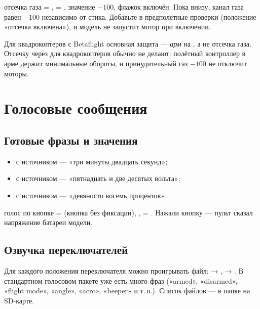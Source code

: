 \begin{recipe}{отсечка газа}
 = ,  = , значение $-100$,
флажок  включён. Пока  внизу, канал газа равен $-100$ независимо
от стика. Добавьте  в предполётные проверки (положение «отсечка включена»),
и модель не запустит мотор при включении.
\end{recipe}

\begin{caution}
Для квадрокоптеров с Betaflight основная защита --- \emph{арм} на , а не отсечка
газа. Отсечку через  для квадрокоптеров обычно не делают: полётный контроллер
в арме держит минимальные обороты, и принудительный газ $-100$ не отключит моторы.
\end{caution}

\section{Голосовые сообщения}

\subsection{Готовые фразы и значения}

\begin{itemize}
  \item {} с источником  --- «три минуты двадцать секунд»;
  \item {} с источником  --- «пятнадцать и две десятых вольта»;
  \item {} с источником  --- «девяносто восемь процентов».
\end{itemize}

\begin{recipe}{голос по кнопке}
 =  (кнопка без фиксации),  ,  =
. Нажали кнопку --- пульт сказал напряжение батареи модели.
\end{recipe}

\subsection{Озвучка переключателей}

Для каждого положения переключателя можно проигрывать файл:  → ,
 → . В стандартном голосовом пакете уже есть много фраз
(«armed», «disarmed», «flight mode», «angle», «acro», «beeper» и т.\,п.). Список файлов --- в
папке  на SD-карте.

